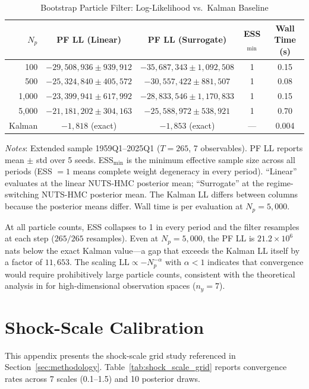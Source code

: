 \documentclass[12pt]{article}
\theoremstyle{plain}
\theoremstyle{definition}
\theoremstyle{remark}
\begin{document}
\begin{table}[htbp]
\centering
\caption{Bootstrap Particle Filter: Log-Likelihood vs.\ Kalman Baseline}
\label{tab:pf_benchmark}
\begin{tabular}{rcccc}
\toprule
$N_p$ & PF LL (Linear) & PF LL (Surrogate) & ESS$_{\min}$ & Wall Time (s) \\
\midrule
100    & $-29{,}508{,}936 \pm 939{,}912$ & $-35{,}687{,}343 \pm 1{,}092{,}508$ & 1 & 0.15 \\
500    & $-25{,}324{,}840 \pm 405{,}572$ & $-30{,}557{,}422 \pm 881{,}507$   & 1 & 0.08 \\
1{,}000 & $-23{,}399{,}941 \pm 617{,}992$ & $-28{,}833{,}546 \pm 1{,}170{,}833$ & 1 & 0.15 \\
5{,}000 & $-21{,}181{,}202 \pm 304{,}163$ & $-25{,}588{,}972 \pm 538{,}921$   & 1 & 0.70 \\
\midrule
Kalman & $-1{,}818$ (exact) & $-1{,}853$ (exact) & --- & 0.004 \\
\bottomrule
\end{tabular}
\smallskip
{\footnotesize \textit{Notes}: Extended sample 1959Q1--2025Q1 ($T=265$, 7 observables). PF LL reports mean $\pm$ std over 5 seeds. ESS$_{\min}$ is the minimum effective sample size across all periods (ESS $=1$ means complete weight degeneracy in every period). ``Linear'' evaluates at the linear NUTS-HMC posterior mean; ``Surrogate'' at the regime-switching NUTS-HMC posterior mean. The Kalman LL differs between columns because the posterior means differ. Wall time is per evaluation at $N_p = 5{,}000$.}
\end{table}

At all particle counts, ESS collapses to 1 in every period and the filter resamples at each step ($265/265$ resamples). Even at $N_p = 5{,}000$, the PF LL is $21.2 \times 10^6$ nats below the exact Kalman value---a gap that exceeds the Kalman LL itself by a factor of $11{,}653$. The scaling $\text{LL} \propto -N_p^{-\alpha}$ with $\alpha < 1$ indicates that convergence would require prohibitively large particle counts, consistent with the theoretical analysis in \citet{snyder2008obstacles} for high-dimensional observation spaces ($n_y = 7$).


\section{Shock-Scale Calibration}
\label{app:shock_scale_calibration}

This appendix presents the shock-scale grid study referenced in Section~\ref{sec:methodology}. Table~\ref{tab:shock_scale_grid} reports convergence rates across 7 scales (0.1--1.5) and 10 posterior draws.
\end{document}
